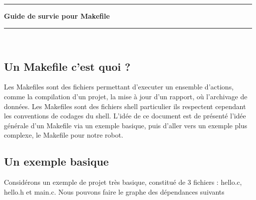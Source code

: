 \documentclass[a4paper,10pt]{article}
\newcommand{\HRule}{\rule{\linewidth}{0.1mm}}
\begin{document}
\begin{spacing}{1.5}
\graphicspath{{image/}}
\setcounter{tocdepth}{2}
\newpage
\pagestyle{fancy} \lhead{} 
\rhead{\thepage} \lfoot{} \cfoot{} 
\HRule
\begin{center}
  \LARGE \textbf{Guide de survie pour Makefile}
\end{center}
\HRule \\

\subsection*{Un Makefile c'est quoi ?}
Les Makefiles sont des fichiers permettant d'executer un ensemble d'actions,
comme la compilation d'un projet, la mise à jour d'un rapport, où l'archivage de
données. Les Makefiles sont des fichiers shell particulier ils respectent
cependant les conventions de codages du shell. L'idée de
ce document est de présenté l'idée générale d'un Makefile via un exemple
basique, puis d'aller vers un exemple plus complexe, le Makefile pour notre
robot.

\subsection*{Un exemple basique}
Considérons un exemple de projet très basique, constitué de 3 fichiers :
hello.c, hello.h et main.c. Nous pouvons faire le graphe des dépendances
suivants
\begin{center}
\end{center}
\end{spacing}
\end{document}
